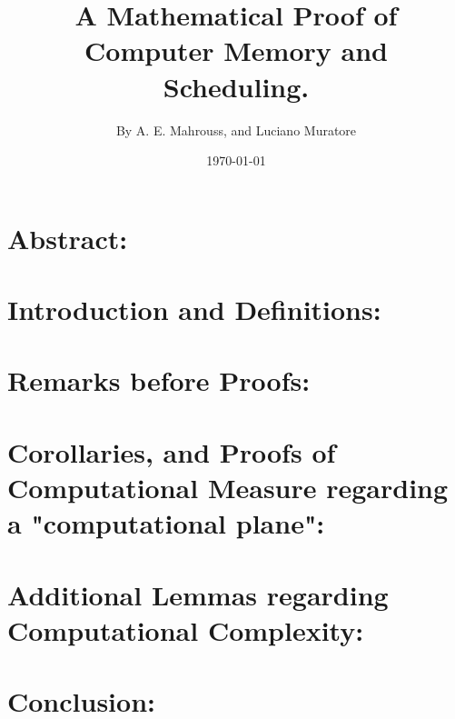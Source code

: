 \documentclass[10pt]{article}
\title{%
	\vspace{-1.5em}%
	\large\textbf{A Mathematical Proof of Computer Memory and Scheduling.}%
}
\author{By A. E. Mahrouss, and Luciano Muratore}
\date{\today}
\theoremstyle{plain}
\theoremstyle{definition}
\theoremstyle{remark}
\begin{document}
	
	\maketitle
	\tableofcontents
	\newpage

\section{Abstract:}
	
\section{Introduction and Definitions:}

\section{Remarks before Proofs:}

\section{Corollaries, and Proofs of Computational Measure regarding a "computational plane":}

\section{Additional Lemmas regarding Computational Complexity:}

\section{Conclusion:}

\nocite{*}


\end{document}
